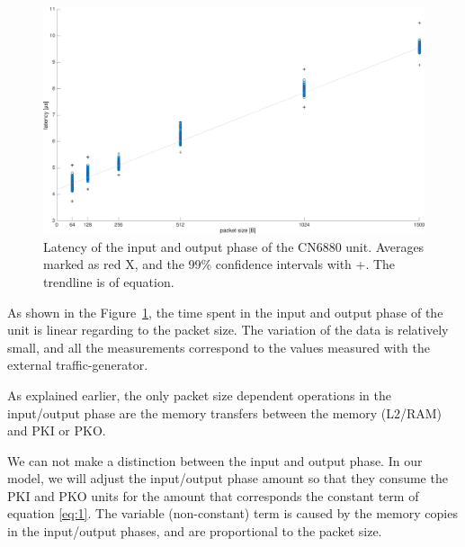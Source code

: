\begin{figure}[]
  \begin{center}
    \includegraphics[width=\textwidth]{images/comm-latency.pdf}
    \caption{Latency of the input and output phase of the CN6880 unit. Averages marked as red X, and the 99\% confidence intervals with +. The trendline is of equation.}
    \label{fig:comm-latency}
  \end{center}
\end{figure}

As shown in the Figure~\ref{fig:comm-latency}, the time spent in the input and output phase of the unit is linear regarding to the packet size. The variation of the data is relatively small, and all the measurements correspond to the values measured with the external traffic-generator.


As explained earlier, the only packet size dependent operations in the input/output phase are the  memory transfers between the memory (L2/RAM) and PKI or PKO.

We can not make a distinction between the input and output phase.
In our model, we will adjust the input/output phase amount so that they consume the PKI and PKO units for the amount that corresponds the constant term of equation \ref{eq:1}. The variable (non-constant) term is caused by the memory copies in the input/output phases, and are proportional to the packet size.

